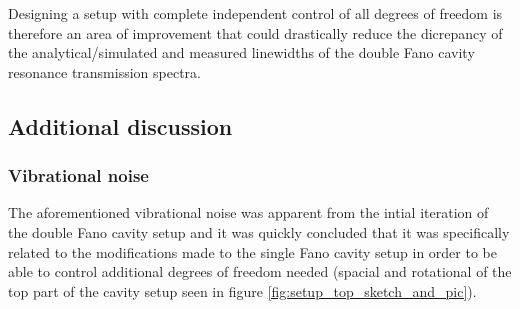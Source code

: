 Designing a setup with complete independent control of all degrees of freedom is therefore an area of improvement that could drastically reduce the dicrepancy of the analytical/simulated and measured linewidths of the double Fano cavity resonance transmission spectra.

\subsection{Additional discussion}\label{sec:additional_discussion}

\subsubsection{Vibrational noise}

The aforementioned vibrational noise was apparent from the intial iteration of the double Fano cavity setup and it was quickly concluded that it was specifically related to the modifications made to the single Fano cavity setup in order to be able to control additional degrees of freedom needed (spacial and rotational of the top part of the cavity setup seen in figure \ref{fig:setup_top_sketch_and_pic}). 

